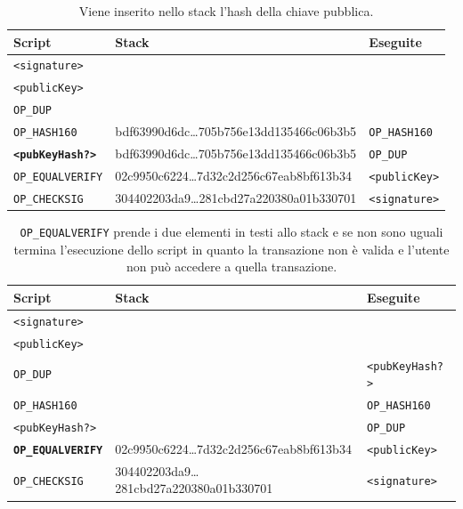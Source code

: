 \begin{table}[H]
    \centering
    \begin{tabular}{p{3cm}|p{7.7cm}|p{3cm}}
        Script & Stack & Eseguite\\
        \hline
        \texttt{<signature>}            & &\\
        \texttt{<publicKey>}            & &\\
        \texttt{OP\_DUP}                & &\\
        \texttt{OP\_HASH160}            & bdf63990d6dc\dots705b756e13dd135466c06b3b5 & \texttt{OP\_HASH160}\\
        \texttt{\textbf{<pubKeyHash?>}} & bdf63990d6dc\dots705b756e13dd135466c06b3b5 & \texttt{OP\_DUP}\\
        \texttt{OP\_EQUALVERIFY}        & 02c9950c6224\dots7d32c2d256c67eab8bf613b34 & \texttt{<publicKey>}\\
        \texttt{OP\_CHECKSIG}           & 304402203da9\dots281cbd27a220380a01b330701 & \texttt{<signature>}\\
    \end{tabular}
    \caption{Viene inserito nello stack l'hash della chiave pubblica.}
\end{table}

\begin{table}[H]
    \centering
    \begin{tabular}{p{3cm}|p{7.7cm}|p{3cm}}
        Script & Stack & Eseguite\\
        \hline
        \texttt{<signature>}              & &\\
        \texttt{<publicKey>}              & &\\
        \texttt{OP\_DUP}                  &                                            & \texttt{<pubKeyHash?>}\\
        \texttt{OP\_HASH160}              &                                            & \texttt{OP\_HASH160}\\
        \texttt{<pubKeyHash?>}            &                                            & \texttt{OP\_DUP}\\
        \texttt{\textbf{OP\_EQUALVERIFY}} & 02c9950c6224\dots7d32c2d256c67eab8bf613b34 & \texttt{<publicKey>}\\
        \texttt{OP\_CHECKSIG}             & 304402203da9\dots281cbd27a220380a01b330701 & \texttt{<signature>}\\
    \end{tabular}
    \caption{\texttt{OP\_EQUALVERIFY} prende i due elementi in testi allo stack e se non sono uguali termina l'esecuzione dello script in quanto la transazione non è valida e l'utente non può accedere a quella transazione.}
\end{table}

